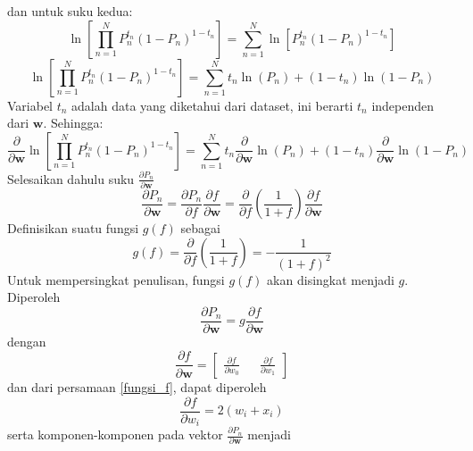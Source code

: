 dan untuk suku kedua:
\begin{equation*}
    \ln{\left[ \prod_{n=1}^{N} P_n^{t_n}\left(1-P_n\right)^{1-t_n} \right] }=\sum_{n=1}^{N} \ln{ \left[ P_n^{t_n}\left(1-P_n\right)^{1-t_n} \right] }
\end{equation*}
\begin{equation*}
    \ln{\left[ \prod_{n=1}^{N} P_n^{t_n}\left(1-P_n\right)^{1-t_n} \right] }=\sum_{n=1}^{N} t_n\ln{(P_n)} + (1-t_n)\ln{(1-P_n)}
\end{equation*}
Variabel $t_n$ adalah data yang diketahui dari dataset, ini berarti $t_n$ independen dari $\mathbf{w}$. Sehingga:
\begin{equation}
    \frac{\partial}{\partial{\mathbf{w}}} \ln{\left[ \prod_{n=1}^{N} P_n^{t_n}\left(1-P_n\right)^{1-t_n} \right] } = \sum_{n=1}^{N} t_n \frac{\partial}{\partial{\mathbf{w}}}\ln{(P_n)} + (1-t_n) \frac{\partial}{\partial{\mathbf{w}}} \ln{(1-P_n)} \label{ODE_2nd_term}
\end{equation}
Selesaikan dahulu suku $\frac{\partial{P_n}}{\partial{\mathbf{w}}}$
\begin{equation*}
    \frac{\partial{P_n}}{\partial{\mathbf{w}}} = \frac{\partial{P_n}}{\partial{f}} \frac{\partial{f}}{\partial{\mathbf{w}}} = \frac{\partial}{\partial{f}} \left( \frac{1}{1+f} \right) \frac{\partial{f}}{\partial{\mathbf{w}}}
\end{equation*}
Definisikan suatu fungsi $g(f)$ sebagai
\begin{equation}
    g(f) = \frac{\partial}{\partial{f}} \left( \frac{1}{1+f} \right) = -\frac{1}{(1+f)^2} \label{fungsi_g}
\end{equation}
Untuk mempersingkat penulisan, fungsi $g(f)$ akan disingkat menjadi $g$. Diperoleh
\begin{equation}
    \frac{\partial{P_n}}{\partial{\mathbf{w}}} = g \frac{\partial{f}}{\partial{\mathbf{w}}} \label{dPndw_vec}
\end{equation}
dengan
\begin{equation}
    \frac{\partial{f}}{\partial{\mathbf{w}}} = \begin{bmatrix} \frac{\partial{f}}{\partial{w_0}} && \frac{\partial{f}}{\partial{w_1}}\end{bmatrix} \label{dfdw_vec}
\end{equation}
dan dari persamaan \ref{fungsi_f}, dapat diperoleh
\begin{equation}
    \frac{\partial{f}}{\partial{w_i}} = 2(w_i+x_i) \label{dfdwn}
\end{equation}
serta komponen-komponen pada vektor $\frac{\partial{P_n}}{\partial{\mathbf{w}}}$ menjadi
